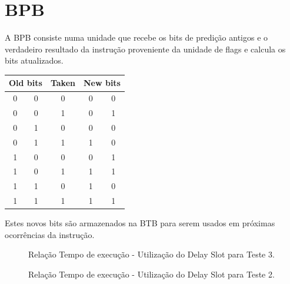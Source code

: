 \section{BPB}
A BPB consiste numa unidade que recebe os bits de predição antigos e o verdadeiro resultado da instrução proveniente da unidade de flags e calcula os bits atualizados.
\begin{table}[H]
	\centering
	\begin{tabular}{cc|c|cc}
		\multicolumn{2}{c|}{Old bits} & Taken & \multicolumn{2}{c}{New bits} \\ \hline
		0 & 0 & 0 & 0 & 0 \\
		0 & 0 & 1 & 0 & 1 \\
		0 & 1 & 0 & 0 & 0 \\
		0 & 1 & 1 & 1 & 0 \\
		1 & 0 & 0 & 0 & 1 \\
		1 & 0 & 1 & 1 & 1 \\
		1 & 1 & 0 & 1 & 0 \\
		1 & 1 & 1 & 1 & 1
	\end{tabular}
\end{table}
Estes novos bits são armazenados na BTB para serem usados em próximas ocorrências da instrução.


\begin{figure}[H]
	\begin{center}
		\caption{Relação Tempo de execução - Utilização do Delay Slot para Teste 3.}
		\label{tempexet3}
	\end{center}
\end{figure}

\begin{figure}[H]
	\begin{center}
		\caption{Relação Tempo de execução - Utilização do Delay Slot para Teste 2.}
		\label{tempexet2}
	\end{center}
\end{figure}

